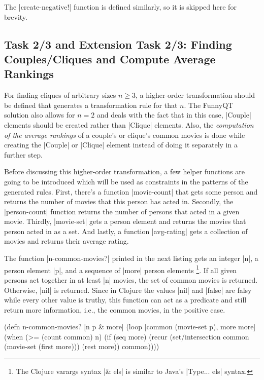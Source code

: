 \documentclass[submission]{eptcs}
\newcommand{\code}{\clojureinline}
\begin{document}
The \code|create-negative!| function is defined similarly, so it is skipped
here for brevity.


\subsection{Task 2/3 and Extension Task 2/3: Finding Couples/Cliques and
  Compute Average Rankings}
\label{sec:task-2:finding-groups}

For finding cliques of arbitrary sizes \(n \geq 3\),
a higher-order transformation should be defined that generates a transformation
rule for that \(n\).
The FunnyQT solution also allows for \(n = 2\)
and deals with the fact that in this case, \code|Couple| elements should be
created rather than \code|Clique| elements.  Also, the \emph{computation of the
  average rankings} of a couple's or clique's common movies is done while
creating the \code|Couple| or \code|Clique| element instead of doing it
separately in a further step.

Before discussing this higher-order transformation, a few helper functions are
going to be introduced which will be used as constraints in the patterns of the
generated rules.  First, there's a function \code|movie-count| that gets some
person and returns the number of movies that this person has acted in.
Secondly, the \code|person-count| function returns the number of persons that
acted in a given movie.  Thirdly, \code|movie-set| gets a person element and
returns the movies that person acted in as a set.  And lastly, a function
\code|avg-rating| gets a collection of movies and returns their average rating.

The function \code|n-common-movies?| printed in the next listing gets an
integer \code|n|, a person element \code|p|, and a sequence of \code|more|
person elements \footnote{The Clojure varargs syntax \code|& els| is similar to
  Java's \code|Type... els| syntax.}.  If all given persons act together in at
least \code|n| movies, the set of common movies is returned.  Otherwise,
\code|nil| is returned.  Since in Clojure the values \code|nil| and
\code|false| are falsy while every other value is truthy, this function can act
as a predicate and still return more information, i.e., the common movies, in
the positive case.

\begin{clojurecode}
(defn n-common-movies? [n p & more]
  (loop [common (movie-set p), more more]
    (when (>= (count common) n)
      (if (seq more)
        (recur (set/intersection common (movie-set (first more))) (rest more))
        common))))
\end{clojurecode}
\end{document}
